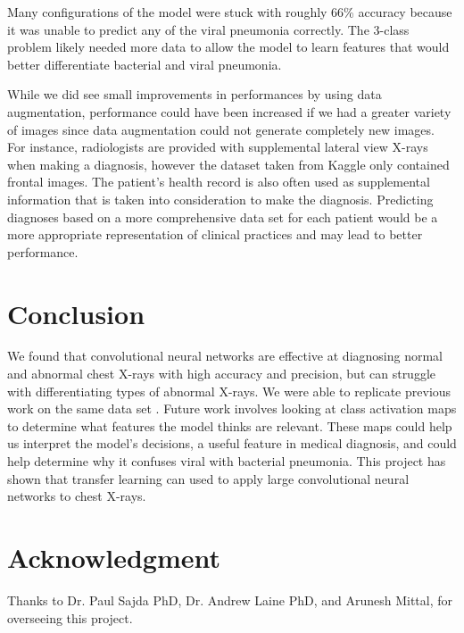 \documentclass[conference]{IEEEtran}
\begin{document}
Many configurations of the model were stuck with roughly 66\% accuracy because it was unable to predict any of the viral pneumonia correctly. The 3-class problem likely needed more data to allow the model to learn features that would better differentiate bacterial and viral pneumonia. 

While we did see small improvements in performances by using data augmentation, performance could have been increased if we had a greater variety of images since data augmentation could not generate completely new images. For instance, radiologists are provided with supplemental lateral view X-rays when making a diagnosis, however the dataset taken from Kaggle only contained frontal images. The patient’s health record is also often used as supplemental information that is taken into consideration to make the diagnosis. Predicting diagnoses based on a more comprehensive data set for each patient would be a more appropriate representation of clinical practices and may lead to better performance. 


\section{Conclusion}
We found that convolutional neural networks are effective at diagnosing normal and abnormal chest X-rays with high accuracy and precision, but can struggle with differentiating types of abnormal X-rays. We were able to replicate previous work on the same data set \cite{kermany2018identifying}. Future work involves looking at class activation maps to determine what features the model thinks are relevant. These maps could help us interpret the model's decisions, a useful feature in medical diagnosis, and could help determine why it confuses viral with bacterial pneumonia. This project has shown that transfer learning can used to apply large convolutional neural networks to chest X-rays. 
\section*{Acknowledgment}

Thanks to Dr. Paul Sajda PhD, Dr. Andrew Laine PhD, and Arunesh Mittal, for overseeing this project. 


 

\newpage
\end{document}
